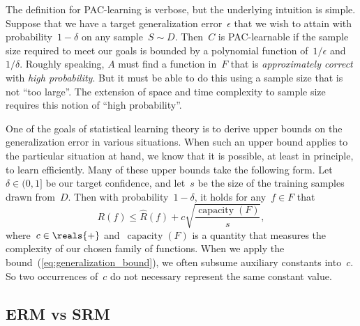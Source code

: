 \documentclass[11pt,a4paper]{article}
\numberwithin{equation}{section}
\newcommand{\capacity}{\operatorname{capacity}}
\begin{document}
The definition for PAC-learning is verbose, but the underlying intuition is
simple. Suppose that we have a target generalization error~$\epsilon$ that we
wish to attain with probability~$1 - \delta$ on any sample~$S \sim D$. Then~$C$
is PAC-learnable if the sample size required to meet our goals is bounded by a
polynomial function of~$1/\epsilon$ and~$1/\delta$. Roughly speaking, $A$ must
find a function in~$F$ that is \emph{approximately correct} with \emph{high
probability}. But it must be able to do this using a sample size that is not
``too large''. The extension of space and time complexity to sample size
requires this notion of ``high probability''.

One of the goals of statistical learning theory is to derive upper bounds on the
generalization error in various situations. When such an upper bound applies to
the particular situation at hand, we know that it is possible, at least in
principle, to learn efficiently. Many of these upper bounds take the following
form. Let~$\delta \in (0, 1]$ be our target confidence, and let~$s$ be the size
of the training samples drawn from~$D$. Then with probability~$1 - \delta$, it
holds for any~$f \in F$ that
\begin{equation}
	R(f) \leq \hat{R}(f) + c \sqrt{\frac{\capacity(F)}{s}},
	\label{eq:generalization_bound}
\end{equation}
where~$c \in \reals{+}$ and~$\capacity(F)$ is a quantity that measures the
complexity of our chosen family of functions. When we apply the
bound~(\ref{eq:generalization_bound}), we often subsume auxiliary constants
into~$c$. So two occurrences of~$c$ do not necessary represent the same constant
value.

\subsection{ERM vs SRM}
\label{sec:erm_vs_srm}
\end{document}
